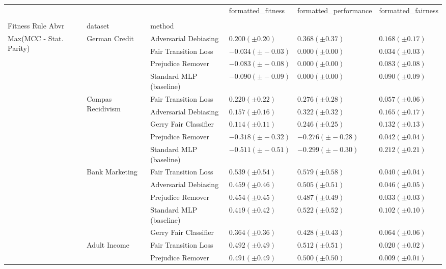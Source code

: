 \begin{tabular}{llllll}
\toprule
 &  &  & formatted_fitness & formatted_performance & formatted_fairness \\
 &  &  &  &  &  \\
Fitness Rule Abvr & dataset & method &  &  &  \\
\midrule
\multirow[t]{19}{*}{Max(MCC - Stat. Parity)} & \multirow[t]{4}{*}{German Credit} & Adversarial Debiasing & $0.200 (\pm0.20)$ & $0.368 (\pm0.37)$ & $0.168 (\pm0.17)$ \\
 &  & Fair Transition Loss & $-0.034 (\pm-0.03)$ & $0.000 (\pm0.00)$ & $0.034 (\pm0.03)$ \\
 &  & Prejudice Remover & $-0.083 (\pm-0.08)$ & $0.000 (\pm0.00)$ & $0.083 (\pm0.08)$ \\
 &  & Standard MLP (baseline) & $-0.090 (\pm-0.09)$ & $0.000 (\pm0.00)$ & $0.090 (\pm0.09)$ \\
\cline{2-6}
 & \multirow[t]{5}{*}{Compas Recidivism} & Fair Transition Loss & $0.220 (\pm0.22)$ & $0.276 (\pm0.28)$ & $0.057 (\pm0.06)$ \\
 &  & Adversarial Debiasing & $0.157 (\pm0.16)$ & $0.322 (\pm0.32)$ & $0.165 (\pm0.17)$ \\
 &  & Gerry Fair Classifier & $0.114 (\pm0.11)$ & $0.246 (\pm0.25)$ & $0.132 (\pm0.13)$ \\
 &  & Prejudice Remover & $-0.318 (\pm-0.32)$ & $-0.276 (\pm-0.28)$ & $0.042 (\pm0.04)$ \\
 &  & Standard MLP (baseline) & $-0.511 (\pm-0.51)$ & $-0.299 (\pm-0.30)$ & $0.212 (\pm0.21)$ \\
\cline{2-6}
 & \multirow[t]{5}{*}{Bank Marketing} & Fair Transition Loss & $0.539 (\pm0.54)$ & $0.579 (\pm0.58)$ & $0.040 (\pm0.04)$ \\
 &  & Adversarial Debiasing & $0.459 (\pm0.46)$ & $0.505 (\pm0.51)$ & $0.046 (\pm0.05)$ \\
 &  & Prejudice Remover & $0.454 (\pm0.45)$ & $0.487 (\pm0.49)$ & $0.033 (\pm0.03)$ \\
 &  & Standard MLP (baseline) & $0.419 (\pm0.42)$ & $0.522 (\pm0.52)$ & $0.102 (\pm0.10)$ \\
 &  & Gerry Fair Classifier & $0.364 (\pm0.36)$ & $0.428 (\pm0.43)$ & $0.064 (\pm0.06)$ \\
\cline{2-6}
 & \multirow[t]{5}{*}{Adult Income} & Fair Transition Loss & $0.492 (\pm0.49)$ & $0.512 (\pm0.51)$ & $0.020 (\pm0.02)$ \\
 &  & Prejudice Remover & $0.491 (\pm0.49)$ & $0.500 (\pm0.50)$ & $0.009 (\pm0.01)$ \\

\end{tabular}

